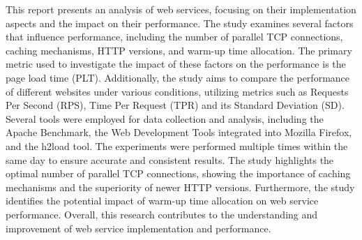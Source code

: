This report presents an analysis of web services, focusing on their implementation aspects and the impact on their performance. 
The study examines several factors that influence performance, including the number of parallel TCP connections, caching mechanisms, 
HTTP versions, and warm-up time allocation.
The primary metric used to investigate the impact of these factors on the performance is the page load time (PLT). Additionally, the study aims to compare the performance of different websites under various conditions, 
utilizing metrics such as Requests Per Second (RPS), Time Per Request (TPR) and its Standard Deviation (SD).
Several tools were employed for data collection and analysis, including the Apache Benchmark, the Web Development Tools integrated into Mozilla Firefox, 
and the h2load tool. The experiments were performed multiple times within the same day to ensure accurate and consistent results.
The study highlights the optimal number of parallel TCP connections, showing the importance of caching mechanisms and  
the superiority of newer HTTP versions. Furthermore, the study identifies the potential impact of warm-up time allocation on web service performance.
Overall, this research contributes to the understanding and improvement of web service implementation and performance. 
